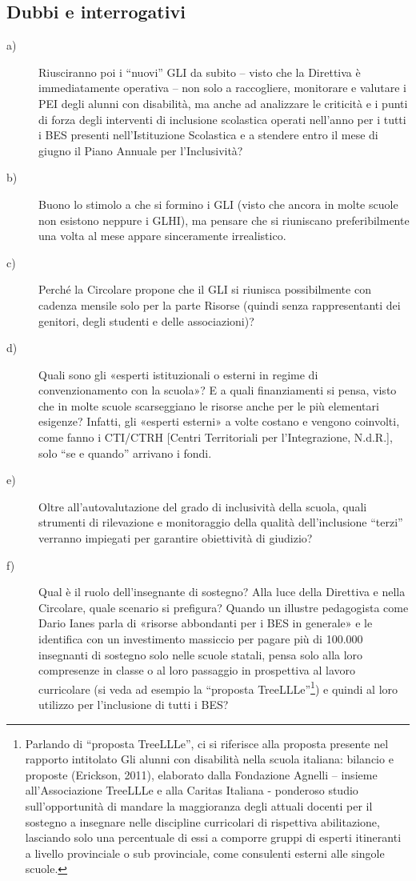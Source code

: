 \subsection*{Dubbi e interrogativi}
\begin{description}
	\item[a)]  Riusciranno poi i “nuovi” GLI da subito – visto che la Direttiva è immediatamente operativa – non solo a raccogliere, monitorare e valutare i PEI degli alunni con disabilità, ma anche ad analizzare le criticità e i punti di forza degli interventi di inclusione scolastica operati nell'anno per i tutti i BES presenti nell'Istituzione Scolastica e a stendere entro il mese di giugno il Piano Annuale per l'Inclusività?
	\item[b)]Buono lo stimolo a che si formino i GLI (visto che ancora in molte scuole non esistono neppure i GLHI), ma pensare che si riuniscano preferibilmente una volta al mese appare sinceramente irrealistico. 
	\item[c)]Perché la Circolare propone che il GLI si riunisca possibilmente con cadenza mensile solo per la parte Risorse (quindi senza rappresentanti dei genitori, degli studenti e delle associazioni)?
	\item[d)]Quali sono gli «esperti istituzionali o esterni in regime di convenzionamento con la scuola»? E a quali finanziamenti si pensa, visto che in molte scuole scarseggiano le risorse anche per le più elementari esigenze? Infatti, gli «esperti esterni» a volte costano e vengono coinvolti, come fanno i CTI/CTRH [Centri Territoriali per l’Integrazione, N.d.R.], solo “se e quando” arrivano i fondi.
	\item[e)]  Oltre all'autovalutazione del grado di inclusività della scuola, quali strumenti di rilevazione e monitoraggio della qualità dell'inclusione “terzi” verranno impiegati per garantire obiettività di giudizio? 
	\item[f)]  Qual è il ruolo dell'insegnante di sostegno? Alla luce della Direttiva e nella Circolare, quale scenario si prefigura? Quando un illustre pedagogista come Dario Ianes parla di «risorse abbondanti per i BES in generale» e le identifica con un investimento massiccio per pagare più di 100.000 insegnanti di sostegno solo nelle scuole statali, pensa solo alla loro compresenze in classe o al loro passaggio in prospettiva al lavoro curricolare (si veda ad esempio la “proposta TreeLLLe”\footnote{Parlando di “proposta TreeLLLe”, ci si riferisce alla proposta presente nel rapporto intitolato Gli alunni con disabilità nella scuola italiana: bilancio e proposte (Erickson, 2011), elaborato dalla Fondazione Agnelli – insieme all'Associazione TreeLLLe e alla Caritas Italiana - ponderoso studio sull'opportunità di mandare la maggioranza degli attuali docenti per il sostegno a insegnare nelle discipline curricolari di rispettiva abilitazione, lasciando solo una percentuale di essi a comporre gruppi di esperti itineranti a livello provinciale o sub provinciale, come consulenti esterni alle singole scuole.}) e quindi al loro utilizzo per l'inclusione di tutti i BES?

\end{description}
